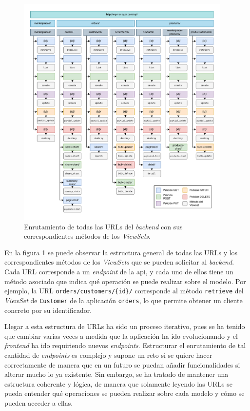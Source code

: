 \begin{figure}[H]
    \centering
    \includegraphics[width=0.95\textwidth]{figures/design_develop/estructura_urls.pdf}
    \caption{Enrutamiento de todas las URLs del \textit{backend} con sus correspondientes métodos de los \textit{ViewSets}.}
    \label{dev:fig:estructura_urls}
\end{figure}

En la figura \ref{dev:fig:estructura_urls} se puede observar la estructura general de todas las URLs y los correspondientes métodos de los \textit{ViewSets} que se pueden solicitar al \textit{backend}. Cada URL corresponde a un \textit{endpoint} de la \gls{api}, y cada uno de ellos tiene un método asociado que indica qué operación se puede realizar sobre el modelo. Por ejemplo, la URL \texttt{orders/customers/\{id\}/} corresponde al método \texttt{retrieve} del \textit{ViewSet} de \texttt{Customer} de la aplicación \texttt{orders}, lo que permite obtener un cliente concreto por su identificador.

Llegar a esta estructura de URLs ha sido un proceso iterativo, pues se ha tenido que cambiar varias veces a medida que la aplicación ha ido evolucionando y el \textit{frontend} ha ido requiriendo nuevos \textit{endpoints}. Estructurar el enrutamiento de tal cantidad de \textit{endpoints} es complejo y supone un reto si se quiere hacer correctamente de manera que en un futuro se puedan añadir funcionalidades si alterar mucho lo ya existente. Sin embargo, se ha tratado de mantener una estructura coherente y lógica, de manera que solamente leyendo las URLs se pueda entender qué operaciones se pueden realizar sobre cada modelo y cómo se pueden acceder a ellas.

